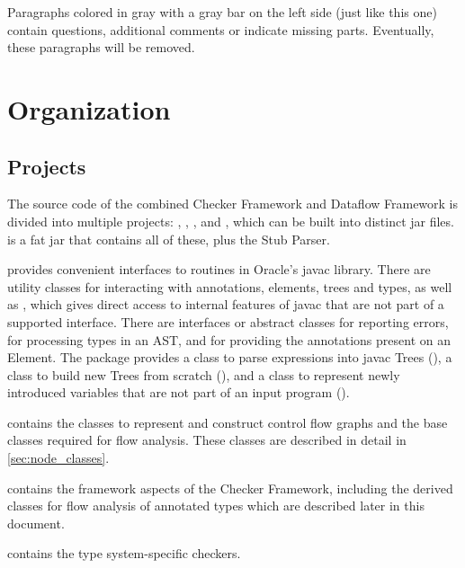 \begin{workinprogress}
    Paragraphs colored in gray with a gray bar on the left side (just
    like this one) contain questions, additional comments or indicate
    missing parts. Eventually, these paragraphs will be removed.
\end{workinprogress}





\section{Organization}

\subsection{Projects}

The source code of the combined Checker Framework and Dataflow
Framework is divided into multiple projects: ,
, , and ,
which can be built into distinct jar files.   is a fat
jar that contains all of these, plus the Stub Parser.

 provides convenient interfaces to routines in
Oracle's javac library.  There are utility classes for interacting
with annotations, elements, trees and types, as well as
, which gives direct access to internal features
of javac that are not part of a supported interface.  There are
interfaces or abstract classes for reporting errors, for processing
types in an AST, and for providing the annotations present on an
Element.
The  package provides a
class to parse expressions into javac Trees (), a
class to build new Trees from  scratch (), and a
class to represent newly introduced variables that are not part of an
input program ().

 contains the classes to represent and construct
control flow graphs and the base classes required for flow analysis.
These classes are described in detail in \autoref{sec:node_classes}.

 contains the framework aspects of the Checker
Framework, including the derived classes for flow analysis of
annotated types which are described later in this document.

 contains the type system-specific checkers.

